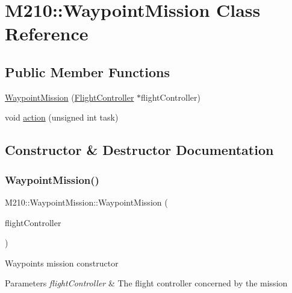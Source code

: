 \hypertarget{class_m210_1_1_waypoint_mission}{}\section{M210\+:\+:Waypoint\+Mission Class Reference}
\label{class_m210_1_1_waypoint_mission}
\subsection*{Public Member Functions}
\begin{DoxyCompactItemize}
\item 
\mbox{\hyperlink{class_m210_1_1_waypoint_mission_adceae05e862690ed217c8b70aca123a2}{Waypoint\+Mission}} (\mbox{\hyperlink{class_m210_1_1_flight_controller}{Flight\+Controller}} $\ast$flight\+Controller)
\item 
void \mbox{\hyperlink{class_m210_1_1_waypoint_mission_ab4f5a1e359026ddcd640cda09501fd6b}{action}} (unsigned int task)
\end{DoxyCompactItemize}


\subsection{Constructor \& Destructor Documentation}
\mbox{\label{class_m210_1_1_waypoint_mission_adceae05e862690ed217c8b70aca123a2}} 
\subsubsection{\texorpdfstring{Waypoint\+Mission()}{WaypointMission()}}
{\footnotesize\ttfamily M210\+::\+Waypoint\+Mission\+::\+Waypoint\+Mission (\begin{DoxyParamCaption}\item[{\mbox{\hyperlink{class_m210_1_1_flight_controller}{Flight\+Controller}} $\ast$}]{flight\+Controller }\end{DoxyParamCaption})\hspace{0.3cm}{\ttfamily [explicit]}}

Waypoints mission constructor 
\begin{DoxyParams}{Parameters}
{\em flight\+Controller} & The flight controller concerned by the mission \\
\hline
\end{DoxyParams}


